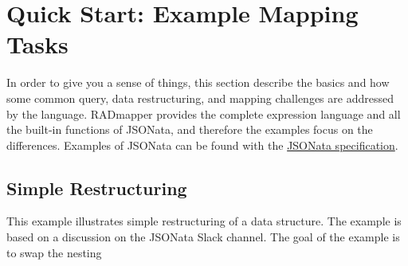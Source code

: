 \documentclass[9pt,letterpaper]{article}
\begin{document}


\section{Quick Start: Example Mapping Tasks}

In order to give you a sense of things, this section describe the basics and how some common query, data restructuring, and mapping challenges are addressed by the language.
RADmapper provides the complete expression language and all the built-in functions of JSONata, and therefore the examples focus on the differences.
Examples of JSONata can be found with the \href{https://jsonata.org/}{JSONata specification}.

\subsection{Simple Restructuring}

This example illustrates simple restructuring of a data structure.
The example is based on a discussion on the JSONata Slack channel.
The goal of the example is to swap the nesting 

\end{document}
